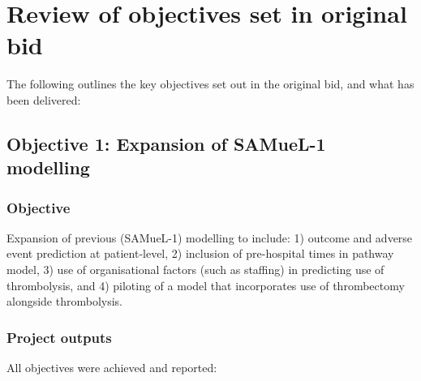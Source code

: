 \section{Review of objectives set in original bid}
\label{sec:objectives_met}

The following outlines the key objectives set out in the original bid, and what has been delivered:

\subsection{Objective 1: Expansion of SAMueL-1 modelling}

\subsubsection*{Objective}

Expansion of previous (SAMueL-1) modelling to include: 1) outcome and adverse event prediction at patient-level, 2) inclusion of pre-hospital times in pathway model, 3) use of organisational factors (such as staffing) in predicting use of thrombolysis, and 4) piloting of a model that incorporates use of thrombectomy alongside thrombolysis.

\subsubsection*{Project outputs}

All objectives were achieved and reported:

